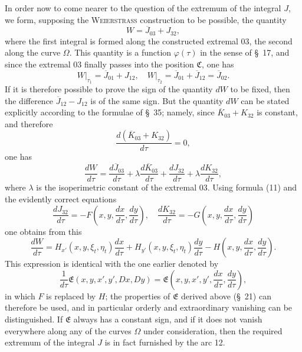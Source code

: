 \documentclass[11pt,a4paper,leqno]{article}
\begin{document}
In order now to come nearer to the question of the extremum of the integral $J$, we form, supposing the \textsc{Weierstrass} construction to be possible, the quantity
\[
W=\overline{J}_{03}+J_{32},
\]
where the first integral is formed along the constructed extremal 03, the second along the curve $\Omega$. This quantity is a function $\varphi(\tau)$ in the sense of \S~17, and since the extremal 03 finally passes into the position $\mathfrak{C}$, one has
\[
W\bigg|_{\tau_1}=\overline{J}_{01}+J_{12},
\quad
W\bigg|_{\tau_2}=\overline{J}_{01}+\overline{J}_{12}=\overline{J}_{02}.
\]
If it is therefore possible to prove the sign of the quantity $dW$ to be fixed, then the difference $\overline{J}_{12}-J_{12}$ is of the same sign. But the quantity $dW$ can be stated explicitly according to the formulae of \S~35; namely, since $\overline{K}_{03}+K_{32}$ is constant, and therefore
\[
\frac{d(\overline{K}_{03}+K_{32})}{d\tau}=0,
\]
one has
\[
\frac{dW}{d\tau}=\frac{d\overline{J}_{03}}{d\tau}+\lambda\frac{d\overline{K}_{03}}{d\tau}
+\frac{dJ_{32}}{d\tau}+\lambda\frac{dK_{32}}{d\tau},
\]
where $\lambda$ is the isoperimetric constant of the extremal 03. Using formula (11) and the evidently correct equations
\[
\frac{dJ_{32}}{d\tau}=-F\left(x,y,\frac{dx}{d\tau},\frac{dy}{d\tau}\right),
\quad
\frac{dK_{32}}{d\tau}=-G\left(x,y,\frac{dx}{d\tau},\frac{dy}{d\tau}\right)
\]
one obtains from this
\begin{equation}\tag{14}
\frac{dW}{d\tau}=H_{x'}(x,y,\xi_t,\eta_t)\frac{dx}{d\tau}
+H_{y'}(x,y,\xi_t,\eta_t)\frac{dy}{d\tau}
-H\left(x,y,\frac{dx}{d\tau},\frac{dy}{d\tau}\right).
\end{equation}
This expression is identical with the one earlier denoted by
\[
\frac{1}{d\tau}\mathfrak{E}(x,y,x',y',Dx,Dy)=
\mathfrak{E}\left(x,y,x',y',\frac{dx}{d\tau},\frac{dy}{d\tau}\right),
\]
in which $F$ is replaced by $H$; the properties of $\mathfrak{E}$ derived above (\S~21) can therefore be used, and in particular orderly and extraordinary vanishing can be distinguished. If $\mathfrak{E}$ always has a constant sign, and if it does not vanish everywhere along any of the curves $\Omega$ under consideration, then the required extremum of the integral $J$ is in fact furnished by the arc 12.
\end{document}
